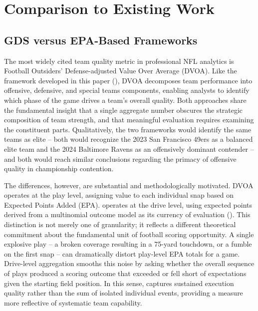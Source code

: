 \section{Comparison to Existing Work}
\label{sec:existing-work}

\subsection{GDS versus EPA-Based Frameworks}
\label{sec:gds-vs-epa}

The most widely cited team quality metric in professional NFL analytics is
Football Outsiders' Defense-adjusted Value Over Average (DVOA). Like the \gds{}
framework developed in this paper (), DVOA decomposes team
performance into offensive, defensive, and special teams components, enabling
analysts to identify which phase of the game drives a team's overall quality.
Both approaches share the fundamental insight that a single aggregate number
obscures the strategic composition of team strength, and that meaningful
evaluation requires examining the constituent parts. Qualitatively, the two
frameworks would identify the same teams as elite -- both would recognize the
2023 San Francisco 49ers as a balanced elite team and the 2024 Baltimore
Ravens as an offensively dominant contender -- and both would reach similar
conclusions regarding the primacy of offensive quality in championship
contention.

The differences, however, are substantial and methodologically motivated. DVOA
operates at the play level, assigning value to each individual snap based on
Expected Points Added (EPA). \gds{} operates at the drive level, using
expected points derived from a multinomial outcome model as its currency of
evaluation (). This
distinction is not merely one of granularity; it reflects a different
theoretical commitment about the fundamental unit of football scoring
opportunity. A single explosive play -- a broken coverage resulting in a
75-yard touchdown, or a fumble on the first snap -- can dramatically distort
play-level EPA totals for a game. Drive-level aggregation smooths this noise
by asking whether the overall sequence of plays produced a scoring outcome
that exceeded or fell short of expectations given the starting field position.
In this sense, \gds{} captures sustained execution quality rather than the
sum of isolated individual events, providing a measure more reflective of
systematic team capability.

